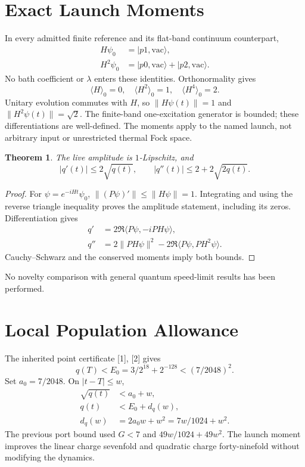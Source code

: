 \documentclass[a4paper,journal]{IEEEtran}
\newtheorem{theorem}{Theorem}
\begin{document}
\section{Exact Launch Moments}
In every admitted finite reference and its flat-band continuum counterpart,
\begin{align}
 H\psi_0&=|p1,\mathrm{vac}\rangle,\\
 H^2\psi_0&=|p0,\mathrm{vac}\rangle+|p2,\mathrm{vac}\rangle.
\end{align}
No bath coefficient or $\lambda$ enters these identities. Orthonormality gives
\begin{equation}
 \langle H\rangle_0=0,\quad\langle H^2\rangle_0=1,\quad\langle H^4\rangle_0=2.
\end{equation}
Unitary evolution commutes with $H$, so $\|H\psi(t)\|=1$ and $\|H^2\psi(t)\|=\sqrt2$. The finite-band one-excitation generator is bounded; these differentiations are well-defined. The moments apply to the named launch, not arbitrary input or unrestricted thermal Fock space.
\begin{theorem}
The live amplitude is $1$-Lipschitz, and
\begin{equation}
 |q'(t)|\le2\sqrt{q(t)},\qquad |q''(t)|\le2+2\sqrt{2q(t)}.
\end{equation}
\end{theorem}
\begin{proof}
For $\psi=e^{-iHt}\psi_0$, $\|(P\psi)'\|\le\|H\psi\|=1$. Integrating and using the reverse triangle inequality proves the amplitude statement, including its zeros. Differentiation gives
\begin{align}
 q'&=2\Re\langle P\psi,-iPH\psi\rangle,\\
 q''&=2\|PH\psi\|^2-2\Re\langle P\psi,PH^2\psi\rangle.
\end{align}
Cauchy--Schwarz and the conserved moments imply both bounds.
\end{proof}
No novelty comparison with general quantum speed-limit results has been performed.
\section{Local Population Allowance}
The inherited point certificate [1], [2] gives
\begin{equation}
 q(T)<E_0=3/2^{18}+2^{-128}<(7/2048)^2.
\end{equation}
Set $a_0=7/2048$. On $|t-T|\le w$,
\begin{align}
 \sqrt{q(t)}&<a_0+w,\\
 q(t)&<E_0+d_q(w),\\
 d_q(w)&=2a_0w+w^2=7w/1024+w^2.
\end{align}
The previous port bound used $G<7$ and $49w/1024+49w^2$. The launch moment improves the linear charge sevenfold and quadratic charge forty-ninefold without modifying the dynamics.
\end{document}
